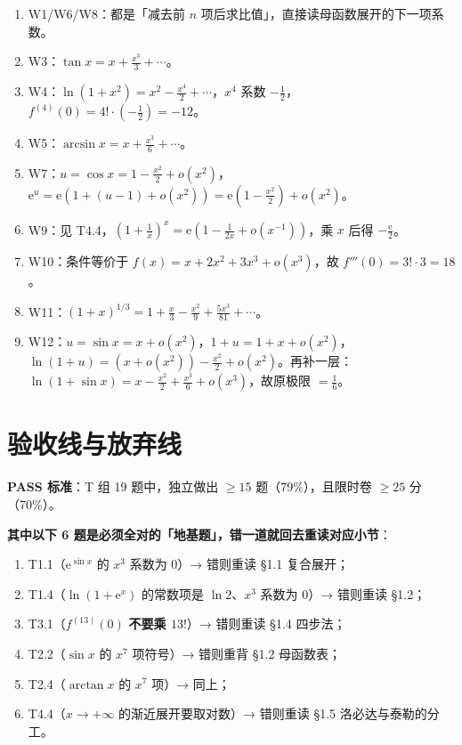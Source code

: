 \documentclass[11pt,a4paper]{ctexart}
\newcommand{\ee}{\mathrm{e}}
\begin{document}
\begin{methodbox}[关键步骤]
\begin{enumerate}
\item W1/W6/W8：都是「减去前 $n$ 项后求比值」，直接读母函数展开的下一项系数。
\item W3：$\tan x=x+\frac{x^{3}}{3}+\cdots$。
\item W4：$\ln(1+x^{2})=x^{2}-\frac{x^{4}}{2}+\cdots$，$x^{4}$ 系数 $-\frac12$，$f^{(4)}(0)=4!\cdot\left(-\frac12\right)=-12$。
\item W5：$\arcsin x=x+\frac{x^{3}}{6}+\cdots$。
\item W7：$u=\cos x=1-\frac{x^{2}}{2}+o(x^{2})$，$\ee^{u}=\ee\left(1+\left(u-1\right)+o(x^{2})\right)=\ee\left(1-\frac{x^{2}}{2}\right)+o(x^{2})$。
\item W9：见 T4.4，$(1+\frac1x)^{x}=\ee(1-\frac{1}{2x}+o(x^{-1}))$，乘 $x$ 后得 $-\frac{\ee}{2}$。
\item W10：条件等价于 $f(x)=x+2x^{2}+3x^{3}+o(x^{3})$，故 $f'''(0)=3!\cdot3=18$。
\item W11：$(1+x)^{1/3}=1+\frac{x}{3}-\frac{x^{2}}{9}+\frac{5x^{3}}{81}+\cdots$。
\item W12：$u=\sin x=x+o(x^{2})$，$1+u=1+x+o(x^{2})$，$\ln(1+u)=\left(x+o(x^{2})\right)-\frac{x^{2}}{2}+o(x^{2})$。再补一层：$\ln(1+\sin x)=x-\frac{x^{2}}{2}+\frac{x^{3}}{6}+o(x^{3})$，故原极限 $=\frac16$。
\end{enumerate}
\end{methodbox}

\newpage
\section{验收线与放弃线}

\begin{warnbox}[验收线]
\textbf{PASS 标准}：T 组 19 题中，独立做出 $\ge15$ 题（79\%），且限时卷 $\ge25$ 分（70\%）。

\textbf{其中以下 6 题是必须全对的「地基题」，错一道就回去重读对应小节}：
\begin{enumerate}
\item T1.1（$\ee^{\sin x}$ 的 $x^{3}$ 系数为 $0$）→ 错则重读 §1.1 复合展开；
\item T1.4（$\ln(1+\ee^{x})$ 的常数项是 $\ln2$、$x^{3}$ 系数为 $0$）→ 错则重读 §1.2；
\item T3.1（$f^{(13)}(0)$ \textbf{不要乘 $13!$}）→ 错则重读 §1.4 四步法；
\item T2.2（$\sin x$ 的 $x^{7}$ 项符号）→ 错则重背 §1.2 母函数表；
\item T2.4（$\arctan x$ 的 $x^{7}$ 项）→ 同上；
\item T4.4（$x\to+\infty$ 的渐近展开要取对数）→ 错则重读 §1.5 洛必达与泰勒的分工。
\end{enumerate}
\end{warnbox}
\end{document}
